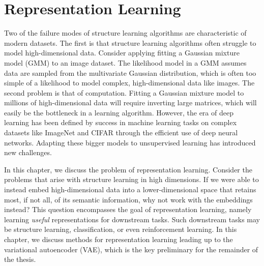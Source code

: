 \chapter{Representation Learning}

Two of the failure modes of structure learning
algorithms are
characteristic
of modern datasets.
The first is that structure learning
algorithms often struggle to 
model high-dimensional data.
Consider applying
fitting a Gaussian mixture
model (GMM) to an image dataset.
The likelihood model in a GMM
assumes data are sampled
from the multivariate Gaussian
distribution, which is
often too simple of a likelihood
to model complex, high-dimensional data like images.
The second problem
is that of computation.
Fitting a Gaussian mixture model
to millions of high-dimensional data
will require inverting
large matrices, which will
easily be the bottleneck in a
learning algorithm.
However, the era of deep learning has
been defined by success in machine learning
tasks on
complex datasets
like ImageNet \citep{Deng2009} and CIFAR \citep{Krizhevsky2009}
through the efficient use of deep neural networks.
Adapting these bigger models
to
unsupervised learning has 
introduced new challenges.

In this chapter, we discuss the problem
of representation learning.
Consider the problems that arise 
with structure learning in high dimensions.
If we were able to instead embed 
high-dimensional data into a lower-dimensional space
that retains most, if not all,
of its semantic information,
why not work with the embeddings instead?
This question encompasses the goal
of representation learning, namely
learning \emph{useful} representations
for downstream tasks.
Such downstream tasks may
be structure learning, classification,
or even reinforcement learning.
In this chapter, we
discuss methods for representation learning
leading up to the variational autoencoder (VAE),
which is the key preliminary
for the remainder of the thesis.


